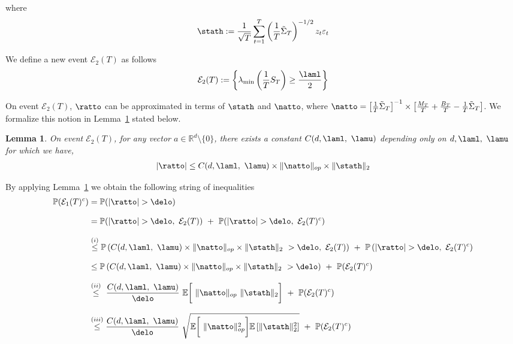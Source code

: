 \documentclass[11pt,letterpaper]{article}
\newcommand{\Prob}{\mathbb{P}}
\newcommand{\Exs}{\mathbb{E}}
\newcommand{\real}{\mathbb{R}}
\newcommand{\z}{z}
\newcommand{\PT}{\tilde{\Sigma}_T}
\newcommand{\Eone}{\mathcal{E}_1(T)}
\newcommand{\Etwo}{\mathcal{E}_2(T)}
\theoremstyle{plain}
\newtheorem{lemma}{Lemma}
\theoremstyle{definition}  %
\begin{document}
\noindent where 
\begin{align*}
    \stath := \frac{1}{\sqrt{T}}\sum^T_{t=1} \left(\frac{1}{T}\PT \right)^{-1/2} \z_t  \varepsilon_t
\end{align*}

\noindent We define a new event $\Etwo$ as follows
\begin{align}\label{eqn:Etwo}
    \Etwo := \left\{ \lambda_{\min} \left ( \frac{1}{T}S_T \right) \geq \frac{\laml}{2} \right\}
\end{align}

\noindent On event $\Etwo$, $\ratto$ can be approximated in terms of $\stath$ and $\natto$, where $\natto = \left[\frac{1}{T} \PT \right]^{-1} \times \left[ \frac{M_T}{T} + \frac{B_T}{T}-\frac{1}{T} \PT\right]$. We formalize this notion in Lemma~\ref{lemma:RT-Etwo-approx} stated below.
\begin{lemma}\label{lemma:RT-Etwo-approx}
    On event $\Etwo$, for any vector $a \in \real^d \setminus \{0\}$, there exists a constant $C(d, \laml,\ \lamu)$ depending only on $d, \laml,\ \lamu$  for which we have,
    \begin{align}
       |\ratto | \leq C(d, \laml,\ \lamu) \times \|\natto\|_{op} \times \| \stath \|_2 
    \end{align}
\end{lemma}


\noindent By applying Lemma~\ref{lemma:RT-Etwo-approx} we obtain the following string of inequalities
\begin{align}\label{eqn:Etwo-ctrA}
\notag
    \Prob(\Eone^c) 
    &= \Prob(|\ratto|>\delo) \\[8pt] \notag
    &= \Prob(|\ratto|>\delo,\ \Etwo) \ + \ \Prob(|\ratto|>\delo,\ \Etwo^c)
    \\[8pt] \notag
    & \overset{(i)}{\leq} \Prob \left( C(d, \laml,\ \lamu) \times \|\natto\|_{op} \times \| \stath \|_2 \ >\delo,\ \Etwo \right) \ + \ \Prob \left(|\ratto|>\delo,\ \Etwo^c \right)\\[8pt] \notag
    &  \leq \Prob \left( C(d, \laml,\ \lamu) \times \|\natto\|_{op} \times \| \stath \|_2  \ >\delo \right) \ + \ \Prob( \Etwo^c)\\[8pt] \notag
    & \overset{(ii)}{\leq}  \ \frac{C(d, \laml,\ \lamu)}{\delo} \ \Exs \bigg[  \ \| \natto \|_{op} \  \|\stath \|_2  \bigg] \ + \ \Prob( \Etwo^c) \\[8pt]
     &\overset{(iii)}{\leq}  \frac{C(d, \laml,\ \lamu)}{\delo} \ \sqrt{\Exs \bigg[ \ \| \natto \|^2_{op}  \bigg] \Exs \left[ \|\stath \|^2_2 \right]} \ + \ \Prob( \Etwo^c )
\end{align}
\end{document}
